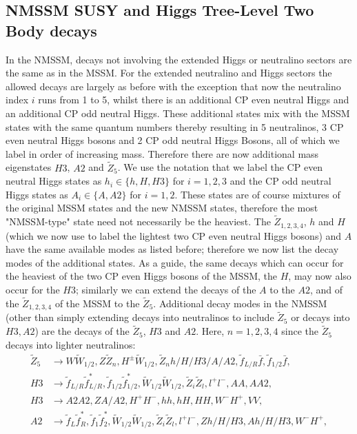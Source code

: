 \documentclass[final,3p,times,pdflatex]{elsarticle}
\begin{document}
\subsection{NMSSM SUSY and Higgs Tree-Level Two Body decays}
In the NMSSM, decays not involving the extended Higgs or neutralino sectors
are the same as in the MSSM\@. For the extended neutralino and Higgs sectors the
allowed decays are largely as before with the exception that now the
neutralino index $i$ runs from 1 to 5, whilst there is an additional CP even neutral
Higgs and an additional CP odd neutral Higgs. These additional states mix with the 
MSSM states with the same quantum numbers thereby resulting in 5 neutralinos, 3 CP
even neutral Higgs bosons and 2 CP odd neutral Higgs Bosons, all of which we label in order
of increasing mass. Therefore there are now additional mass eigenstates $H3$, $A2$ and $\tilde{Z}_5$.
We use the notation that we label the CP even neutral Higgs states as $h_i \in \{h,H,H3\}$ for $i=1,2,3$ and the CP odd neutral Higgs states as $A_i \in \{A,A2\}$ for $i=1,2$.
These states are of course mixtures of the original MSSM states and the new NMSSM states, therefore the most "NMSSM-type" state need not necessarily be the heaviest.
The $\tilde{Z}_{1,2,3,4}$, $h$ and $H$ (which we now use to label the lightest two CP even neutral Higgs
bosons) and $A$ have the same available modes as listed before; therefore we now list the decay
modes of the additional states. As a guide, the same decays which can occur for the heaviest
of the two CP even Higgs bosons of the MSSM, the $H$, may now also occur for the $H3$; similarly
we can extend the decays of the $A$ to the $A2$, and of the $\tilde{Z}_{1,2,3,4}$ of the MSSM
to the $\tilde{Z}_5$. Additional decay modes in the NMSSM (other than simply extending decays into
neutralinos to include $\tilde Z_5$ or decays into $H3, A2$) are the decays of
the $\tilde{Z}_5$, $H3$ and $A2$. Here, $n=1,2,3,4$ since the $\tilde{Z}_5$
decays into lighter neutralinos: 
\begin{align*}
\tilde{Z}_5 &\rightarrow W \tilde{W}_{1/2}, Z \tilde{Z}_n, H^{\pm}
              \tilde{W}_{1/2}, \tilde{Z}_n h/H/H3/A/A2,  \tilde{f}_{L/R}
              \bar{f}, \tilde{f}_{1/2} \bar{f} , \\
H3 &\rightarrow \tilde{f}_{L/R} \tilde{f}_{L/R}^*, \tilde{f}_{1/2}
     \tilde{f}_{1/2}^*, \tilde{W}_{1/2} \tilde{W}_{1/2},  \tilde{Z}_i
     \tilde{Z}_l, l^+ l^-, AA, A A2, \\
H3 &\rightarrow A2 A2, Z A/A2, H^+ H^-, hh, hH, HH, W^- H^+, VV , \\
A2 &\rightarrow \tilde{f}_{L} \tilde{f}_{R}^*, \tilde{f}_{1} \tilde{f}_{2}^*, \tilde{W}_{1/2} \tilde{W}_{1/2},  \tilde{Z}_i \tilde{Z}_l, l^+ l^-, Z h/H/H3, A h/H/H3, W^- H^+ ,
\end{align*}
\end{document}
